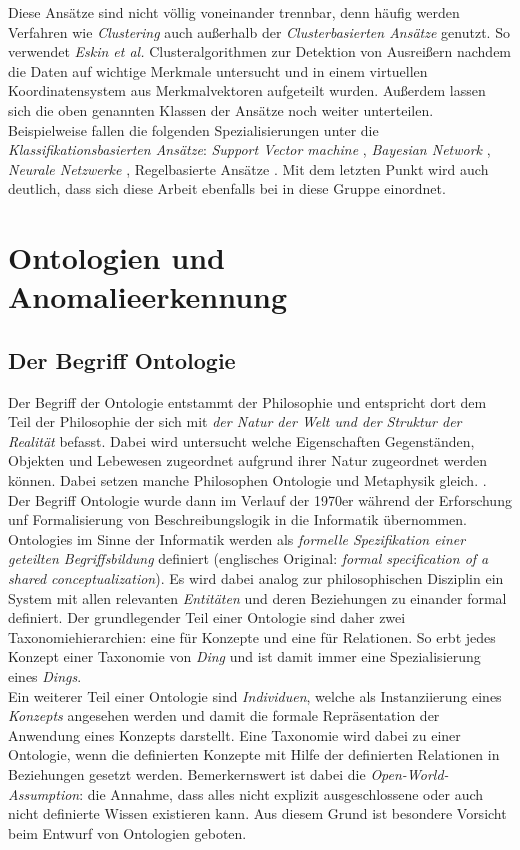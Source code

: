 Diese Ansätze sind nicht völlig voneinander trennbar, denn häufig werden Verfahren wie \textit{Clustering} auch außerhalb der \textit{Clusterbasierten Ansätze} genutzt. So verwendet \textit{Eskin et al.} \cite{eskin2002geometric} Clusteralgorithmen zur Detektion von Ausreißern nachdem die Daten auf wichtige Merkmale untersucht und in einem virtuellen Koordinatensystem aus Merkmalvektoren aufgeteilt wurden. Außerdem lassen sich die oben genannten Klassen der Ansätze noch weiter unterteilen. Beispielweise fallen die folgenden Spezialisierungen unter die \textit{Klassifikationsbasierten Ansätze}: \textit{Support Vector machine} \cite{noble2006support}, \textit{Bayesian Network} \cite{kruegel2003bayesian}, \textit{Neurale Netzwerke} \cite{zhang2001hide}, Regelbasierte Ansätze \cite{yang2013rule}. Mit dem letzten Punkt wird auch deutlich, dass sich diese Arbeit ebenfalls bei in diese Gruppe einordnet.

\section{Ontologien und Anomalieerkennung}
\subsection{Der Begriff Ontologie}
Der Begriff der \Gls{Ontologie} entstammt der Philosophie und entspricht dort dem Teil der Philosophie der sich mit \textit{der Natur der Welt und der Struktur der Realität} befasst. Dabei wird untersucht welche Eigenschaften  Gegenständen, Objekten und Lebewesen zugeordnet aufgrund ihrer Natur zugeordnet werden können. Dabei setzen manche Philosophen \Gls{Ontologie} und Metaphysik gleich. \cite{guarino2009ontology}.\\
Der Begriff \Gls{Ontologie} wurde dann im Verlauf der 1970er während der Erforschung unf Formalisierung von Beschreibungslogik in die Informatik übernommen\cite{roy2010exploitation}. \Glspl{Ontologie} im Sinne der Informatik werden als \textit{formelle Spezifikation einer geteilten Begriffsbildung} definiert (englisches Original: \textit{formal speciﬁcation of a shared conceptualization}\cite{borst1999construction}). Es wird dabei analog zur philosophischen Disziplin ein System mit allen relevanten \textit{Entitäten} und deren Beziehungen zu einander formal definiert. Der grundlegender Teil einer Ontologie sind daher zwei Taxonomiehierarchien: eine für Konzepte und eine für Relationen. So erbt jedes Konzept einer Taxonomie von \textit{Ding} und ist damit immer eine Spezialisierung eines \textit{Dings}.\\
Ein weiterer Teil einer Ontologie sind \textit{Individuen}, welche als Instanziierung eines \textit{Konzepts} angesehen werden und damit die formale Repräsentation der Anwendung eines Konzepts darstellt. Eine Taxonomie wird dabei zu einer Ontologie, wenn die definierten Konzepte mit Hilfe der definierten Relationen in Beziehungen gesetzt werden. Bemerkernswert ist dabei die \textit{Open-World-Assumption}: die Annahme, dass alles nicht explizit ausgeschlossene oder auch nicht definierte Wissen existieren kann\cite{razniewski2016turning}. Aus diesem Grund ist besondere Vorsicht beim Entwurf von Ontologien geboten.

